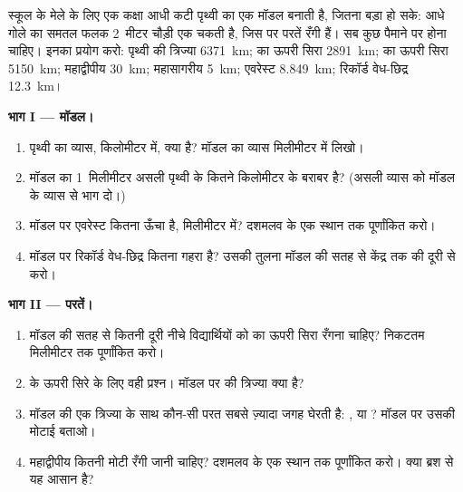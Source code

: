 \begin{problem}
\label{pb:g6:inside-the-earth:1}
स्कूल के मेले के लिए एक कक्षा आधी कटी पृथ्वी का एक मॉडल बनाती है, जितना
बड़ा हो सके: आधे गोले का समतल फलक 2~मीटर चौड़ी एक चकती है,
जिस पर परतें रँगी हैं। सब कुछ पैमाने पर होना चाहिए। इनका प्रयोग करो: पृथ्वी की
त्रिज्या 6371~km;  का ऊपरी सिरा 2891~km;  का ऊपरी सिरा
5150~km; महाद्वीपीय  30~km; महासागरीय  5~km; एवरेस्ट 8.849~km;
रिकॉर्ड वेध-छिद्र 12.3~km।

\medskip
\noindent\textbf{भाग I --- मॉडल।}
\begin{enumerate}
  \item पृथ्वी का व्यास, किलोमीटर में, क्या है? मॉडल का
        व्यास मिलीमीटर में लिखो।
  \item मॉडल का 1~मिलीमीटर असली पृथ्वी के कितने किलोमीटर के बराबर है?
        (असली व्यास को मॉडल के व्यास से भाग दो।)
  \item मॉडल पर एवरेस्ट कितना ऊँचा है, मिलीमीटर में? दशमलव के एक
        स्थान तक पूर्णांकित करो।
  \item मॉडल पर रिकॉर्ड वेध-छिद्र कितना गहरा है? उसकी तुलना मॉडल की सतह से
        केंद्र तक की दूरी से करो।
\end{enumerate}

\medskip
\noindent\textbf{भाग II --- परतें।}
\begin{enumerate}[resume]
  \item मॉडल की सतह से कितनी दूरी नीचे विद्यार्थियों को  का ऊपरी
        सिरा रँगना चाहिए? निकटतम मिलीमीटर तक पूर्णांकित करो।
  \item {} के ऊपरी सिरे के लिए वही प्रश्न। मॉडल पर  की
        त्रिज्या क्या है?
  \item मॉडल की एक त्रिज्या के साथ कौन-सी परत सबसे ज़्यादा जगह घेरती है:
        ,  या ? मॉडल पर उसकी मोटाई
        बताओ।
  \item महाद्वीपीय  कितनी मोटी रँगी जानी चाहिए? दशमलव के एक
        स्थान तक पूर्णांकित करो। क्या ब्रश से यह आसान है?
\end{enumerate}


\end{problem}

